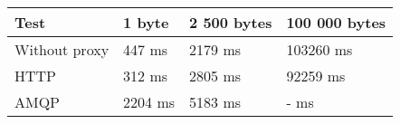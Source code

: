 \begin{tabularx}{\textwidth}{llll}
\hline
 Test          & 1 byte   & 2 500 bytes   & 100 000 bytes   \\
\hline
 Without proxy & 447 ms   & 2179 ms       & 103260 ms       \\
 HTTP          & 312 ms   & 2805 ms       & 92259 ms        \\
 AMQP          & 2204 ms  & 5183 ms       & - ms            \\
\hline
\end{tabularx}